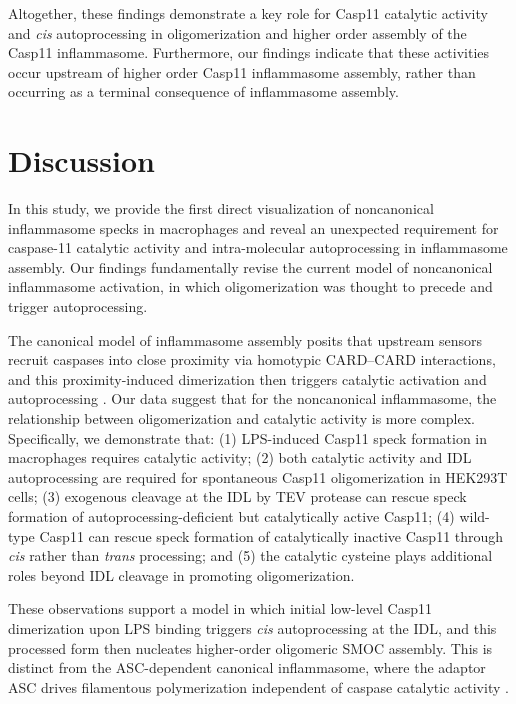 \documentclass[11pt]{article}
\begin{document}
Altogether, these findings demonstrate a key role for Casp11 catalytic activity and \textit{cis} autoprocessing in oligomerization and higher order assembly of the Casp11 inflammasome. Furthermore, our findings indicate that these activities occur upstream of higher order Casp11 inflammasome assembly, rather than occurring as a terminal consequence of inflammasome assembly.

\section{Discussion}

In this study, we provide the first direct visualization of noncanonical inflammasome specks in macrophages and reveal an unexpected requirement for caspase-11 catalytic activity and intra-molecular autoprocessing in inflammasome assembly. Our findings fundamentally revise the current model of noncanonical inflammasome activation, in which oligomerization was thought to precede and trigger autoprocessing.

The canonical model of inflammasome assembly posits that upstream sensors recruit caspases into close proximity via homotypic CARD--CARD interactions, and this proximity-induced dimerization then triggers catalytic activation and autoprocessing \citep{lu2014unified}. Our data suggest that for the noncanonical inflammasome, the relationship between oligomerization and catalytic activity is more complex. Specifically, we demonstrate that: (1) LPS-induced Casp11 speck formation in macrophages requires catalytic activity; (2) both catalytic activity and IDL autoprocessing are required for spontaneous Casp11 oligomerization in HEK293T cells; (3) exogenous cleavage at the IDL by TEV protease can rescue speck formation of autoprocessing-deficient but catalytically active Casp11; (4) wild-type Casp11 can rescue speck formation of catalytically inactive Casp11 through \textit{cis} rather than \textit{trans} processing; and (5) the catalytic cysteine plays additional roles beyond IDL cleavage in promoting oligomerization.

These observations support a model in which initial low-level Casp11 dimerization upon LPS binding triggers \textit{cis} autoprocessing at the IDL, and this processed form then nucleates higher-order oligomeric SMOC assembly. This is distinct from the ASC-dependent canonical inflammasome, where the adaptor ASC drives filamentous polymerization independent of caspase catalytic activity \citep{lu2014unified}.
\end{document}
